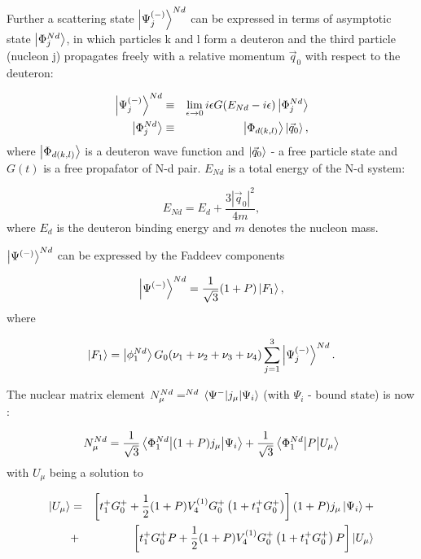     Further a scattering state $\ket{\Psi^{(-)}_j}^{Nd}$ can be expressed
    in terms of asymptotic state $\ket{\Phi^{Nd}_j}$, in which particles
    k and l form a deuteron and the third particle (nucleon j)
     propagates freely with a relative momentum $\vec{q}_0$ with 
    respect to the deuteron:

    \begin{eqnarray}
        \ket{\Psi^{(-)}_j}^{Nd} &\equiv& \lim_{\epsilon \rightarrow 0} 
        i \epsilon G(E_{Nd} - i\epsilon)\ket{\Phi^{Nd}_j}\\
        \ket{\Phi^{Nd}_j} &\equiv& \ket{\Phi_{d(k,l)}}\ket{\vec{q}_0},
    \end{eqnarray}
    where $\ket{\Phi_{d(k,l)}}$ is a deuteron wave function and 
    $\ket{\vec{q}_0}$ - a free particle state and $G(t)$ is 
    a free propafator of N-d pair. 
    $E_{Nd}$ is a total energy of the N-d system:

    \begin{equation}
        E_{Nd} = E_d + \frac{3 |\vec{q}_0|^2}{4m},
    \end{equation}
    where $E_d$ is the deuteron binding energy and $m$ denotes the nucleon mass. 

    $\ket{\Psi^{(-)}}^{Nd}$ can be expressed by the Faddeev components

    \begin{equation}
        \ket{\Psi^{(-)}}^{Nd} = \frac{1}{\sqrt{3}} (1+P) \ket{F_1},
    \end{equation}
    where 
    
    \begin{equation}
        \ket{F_1} = \ket{\phi_1^{Nd}} G_0 (\nu_1 + \nu_2 + \nu_3 + \nu_4) 
        \sum_{j=1}^3 \ket{\Psi_j^{(-)}}^{Nd}.
    \end{equation}

    The nuclear matrix element $N_\mu^{Nd} = ^{Nd} \matrixel{\Psi^{-}}{j_\mu}{\Psi_i}$ 
    (with $\Psi_i$ - bound state) is now \cite{GLOCKLE_report_1996, skibinski_prc_2003} :

    \begin{equation}
        N_\mu^{N d}=\frac{1}{\sqrt{3}} \matrixel{\Phi_1^{N d}}{(1+P) j_\mu}{\Psi_i}
        +\frac{1}{\sqrt{3}} \matrixel{\Phi_1^{N d}}{P}{U_\mu}
    \end{equation}
    with $U_\mu$ being a solution to

    \begin{eqnarray}
       \ket{U_\mu} &=& \left[t_1^{+} G_0^{+}+\frac{1}{2}(1+P) V_4^{(1)} G_0^{+}\left(1+t_1^{+} G_0^{+}\right)\right](1+P) j_\mu \ket{\Psi_i} + \nonumber\\
       &+& \left[t_1^{+} G_0^{+} P+\frac{1}{2}(1+P) V_4^{(1)} G_0^{+}\left(1+t_1^{+} G_0^{+}\right) P\right]\ket{U_\mu}
       \label{u_mu_nd}
    \end{eqnarray}

